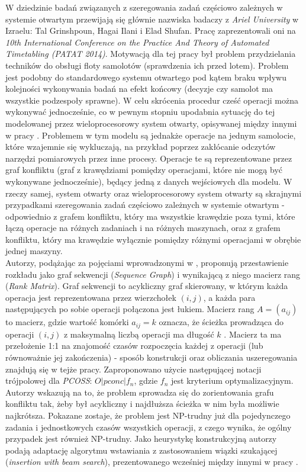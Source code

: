 \documentclass[brudnopis]{xmgr}
\begin{document}
W dziedzinie badań związanych z szeregowania zadań częściowo zależnych w systemie otwartym przewijają się głównie nazwiska badaczy z \emph{Ariel University} w Izraelu: Tal Grinshpoun, Hagai Ilani i Elad Shufan. Pracę \cite{grinshpoun2014partially} zaprezentowali oni na \emph{10th International Conference on the Practice And Theory of Automated Timetabling (PATAT 2014)}. Motywacją dla tej pracy był problem przydzielania techników do obsługi floty samolotów (sprawdzenia ich przed lotem). Problem jest podobny do standardowego systemu otwartego pod kątem braku wpływu kolejności wykonywania badań na efekt końcowy (decyzje czy samolot ma wszystkie podzespoły sprawne). W celu skrócenia procedur cześć operacji można wykonywać jednocześnie, co w pewnym stopniu upodabnia sytuację do tej modelowanej przez wieloprocesorowy system otwarty, opisywanej między innymi w pracy \cite{adakmultiprocessor}. Problemem w tym modelu są jednakże operacje na jednym samolocie, które wzajemnie się wykluczają, na przykład poprzez zakłócanie odczytów narzędzi pomiarowych przez inne procesy. Operacje te są reprezentowane przez graf konfliktu (graf z krawędziami pomiędzy operacjami, które nie mogą być wykonywane jednocześnie), będący jedną z danych wejściowych dla modelu. W rzeczy samej, system otwarty oraz wieloprocesorowy system otwarty są skrajnymi przypadkami szeregowania zadań częściowo zależnych w systemie otwartym - odpowiednio z grafem konfliktu, który ma wszystkie krawędzie poza tymi, które łączą operacje na różnych zadaniach i na różnych maszynach, oraz z grafem konfliktu, który ma krawędzie wyłącznie pomiędzy różnymi operacjami w obrębie jednej maszyny.\\
Autorzy, podążając za pojęciami wprowadzonymi w \cite{brasel2006matrices}, proponują przestawienie rozkładu jako graf sekwencji (\emph{Sequence Graph}) i wynikającą z niego macierz rang (\emph{Rank Matrix}). Graf sekwencji to acykliczny graf skierowany, w którym każda operacja jest reprezentowana przez wierzchołek $(i, j)$, a każda para następujących po sobie operacji połączona jest łukiem. Macierz rang $A = (a_{ij})$ to macierz, gdzie wartość komórki $a_{ij} = k$ oznacza, że ścieżka prowadząca do operacji $(i, j)$ z maksymalną liczbą operacji ma długość $k$ \cite{brasel2008heuristic}. Macierz ta ma przełożenie 1:1 na znajomość czasów rozpoczęcia każdej z operacji (lub równoważnie jej zakończenia) - sposób konstrukcji oraz obliczania uszeregowania znajdują się w tejże pracy. Zaproponowano użycie następującej notacji trójpolowej dla \emph{PCOSS}: $O|pconc|f_n$, gdzie $f_n$ jest kryterium optymalizacyjnym. Autorzy wskazują na to, że problem sprowadza się do zorientowania grafu konfliktu tak, żeby był acykliczny i najdłuższa ścieżka w nim była możliwie najkrótsza. Pokazane zostaje, że problem jest NP-trudny już dla pojedynczego zadania i jednostkowych czasów wszystkich operacji, z czego wynika, że ogólny przypadek jest również NP-trudny. Jako heurystykę konstrukcyjną autorzy podają adaptację algorytmu wstawiania z zastosowaniem wiązki szukającej (\emph{insertion with beam search}), prezentowanego wcześniej między innymi w pracy \cite{brasel1993constructive}.
\medskip
\end{document}
